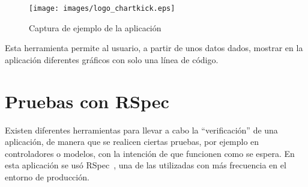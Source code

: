 \begin{figure}[!th]
\begin{center}
\texttt{[image: images/logo\_chartkick.eps]}
\caption{Captura de ejemplo de la aplicación}
\label{fig:8}
\end{center}
\end{figure}

Esta herramienta permite al usuario, a partir de unos datos dados, mostrar en la aplicación diferentes gráficos con solo una línea de código.


\section{Pruebas con RSpec}
\label{3:sec:6}

Existen diferentes herramientas para llevar a cabo la ``verificación'' de una aplicación, de manera que se realicen ciertas pruebas, por ejemplo en controladores o modelos, con la intención de que funcionen como se espera. En esta aplicación se usó RSpec~\cite{RSpec}, una de las utilizadas con más frecuencia en el entorno de producción.
